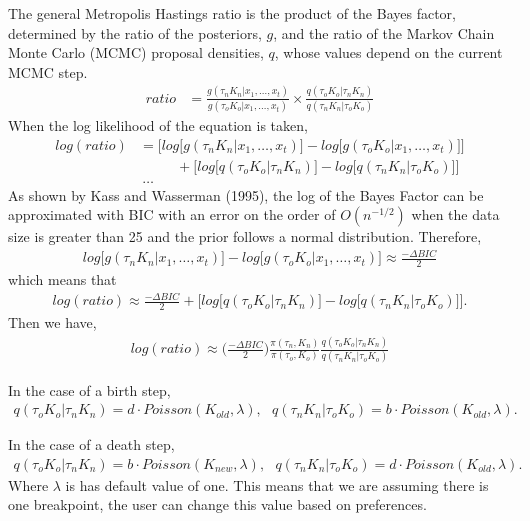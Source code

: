 \documentclass[submit]{smj}
\begin{document}
The general Metropolis Hastings ratio is the product of the Bayes factor, determined by the ratio of the posteriors, $g$, and the ratio of the Markov Chain Monte Carlo (MCMC) proposal densities, $q$, whose values depend on the current MCMC step. 
\begin{align*}
ratio &= \frac{g(\tau_{n} K_{n} | x_1,\dots,x_t) }{g(\tau_{o} K_{o} | x_1,\dots,x_t)} \times \frac{q(\tau_{o} K_{o} | \tau_{n} K_{n})}{q(\tau_{n} K_{n}| \tau_{o} K_{o})}
\end{align*}
When the log likelihood of the equation is taken, 
\begin{align*}
log(ratio) & =\Big[ log \big[ g(\tau_{n} K_{n} | x_1,\dots,x_t)
\big] - log \big[ g(\tau_{o} K_{o} | x_1,\dots,x_t)\big] \Big] \\
& \ \ \ \ \ \ \ \ \ \ \ \ + 
\Big[ log \big[ q(\tau_{o} K_{o} | \tau_{n} K_{n}) \big] - log \big[ q(\tau_{n} K_{n}| \tau_{o} K_{o})  \big] \Big] \\
& \ …
\end{align*}
As shown by Kass and Wasserman (1995), the log of the Bayes Factor can be approximated with BIC with an error on the order of $O(n^{-1/2})$ when the data size is greater than 25 and the prior follows a normal distribution.
Therefore, 
\begin{align*}
 log \big[ g(\tau_{n} K_{n} | x_1,\dots,x_t)
\big] - log \big[ g(\tau_{o} K_{o} | x_1,\dots,x_t)\big]  \approx \frac{- \Delta BIC}{2} 
\end{align*}
which means that 
\begin{align*}
log(ratio) \approx \frac{- \Delta BIC}{2} + 
\Big[ log \big[ q(\tau_{o} K_{o} | \tau_{n} K_{n}) \big] - log \big[ q(\tau_{n} K_{n}| \tau_{o} K_{o})  \big] \Big].
\end{align*}
Then we have,
\begin{align*}
log(ratio) \approx \Big( \frac{- \Delta BIC}{2}\Big) \frac{\pi (\tau_n,K_n)}{\pi(\tau_o,K_o)} \frac{q(\tau_o K_o | \tau_nK_n)}{q(\tau_n K_n | \tau_oK_o)}
\end{align*}

In the case of a birth step, 
\begin{align*} 
q(\tau_{o} K_{o} | \tau_{n} K_{n}) =  d \cdot Poisson(K_{old} , \lambda), \ \ \ q(\tau_{n} K_{n} | \tau_{o} K_{o}) = b \cdot Poisson(K_{old} , \lambda).
\end{align*}

In the case of a death step,  
\begin{align*}
q(\tau_{o} K_{o} | \tau_{n} K_{n}) =  b \cdot Poisson(K_{new} , \lambda) , \ \ \ q(\tau_{n} K_{n} | \tau_{o} K_{o}) = d \cdot Poisson(K_{old} , \lambda).
\end{align*} 
Where $\lambda$ is has default value of one. This means that we are assuming there is one breakpoint, the user can change this value based on preferences.  
\end{document}
